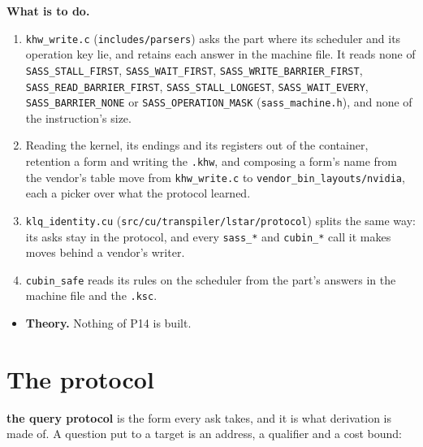 \textbf{What is to do.}

\begin{enumerate}
\item \texttt{khw\_\allowbreak{}write.\allowbreak{}c} (\texttt{includes/\allowbreak{}parsers}) asks the part where its scheduler and its operation key lie, and retains each answer in the machine file. It reads none of \texttt{SASS\_\allowbreak{}STALL\_\allowbreak{}FIRST}, \texttt{SASS\_\allowbreak{}WAIT\_\allowbreak{}FIRST}, \texttt{SASS\_\allowbreak{}WRITE\_\allowbreak{}BARRIER\_\allowbreak{}FIRST}, \texttt{SASS\_\allowbreak{}READ\_\allowbreak{}BARRIER\_\allowbreak{}FIRST}, \texttt{SASS\_\allowbreak{}STALL\_\allowbreak{}LONGEST}, \texttt{SASS\_\allowbreak{}WAIT\_\allowbreak{}EVERY}, \texttt{SASS\_\allowbreak{}BARRIER\_\allowbreak{}NONE} or \texttt{SASS\_\allowbreak{}OPERATION\_\allowbreak{}MASK} (\texttt{sass\_\allowbreak{}machine.\allowbreak{}h}), and none of the instruction's size.
\item Reading the kernel, its endings and its registers out of the container, retention a form and writing the \texttt{.\allowbreak{}khw}, and composing a form's name from the vendor's table move from \texttt{khw\_\allowbreak{}write.\allowbreak{}c} to \texttt{vendor\_\allowbreak{}bin\_\allowbreak{}layouts/\allowbreak{}nvidia}, each a picker over what the protocol learned.
\item \texttt{klq\_\allowbreak{}identity.\allowbreak{}cu} (\texttt{src/\allowbreak{}cu/\allowbreak{}transpiler/\allowbreak{}lstar/\allowbreak{}protocol}) splits the same way: its asks stay in the protocol, and every \texttt{sass\_\allowbreak{}*} and \texttt{cubin\_\allowbreak{}*} call it makes moves behind a vendor's writer.
\item \texttt{cubin\_\allowbreak{}safe} reads its rules on the scheduler from the part's answers in the machine file and the \texttt{.\allowbreak{}ksc}.
\end{enumerate}

\begin{itemize}
\item \textbf{Theory.} Nothing of P14 is built.
\end{itemize}

\section{\texorpdfstring{The protocol}{The protocol}}

\textbf{the query protocol} is the form every ask takes, and it is what derivation is made of. A question put to a target is an address, a qualifier and a cost bound:

